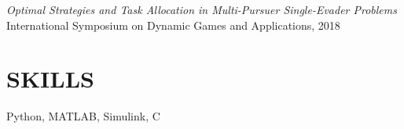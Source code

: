 \documentclass[margin, 10pt]{res} %
\newcommand{\ak}[1]{\textcolor{blue}{#1}}
\begin{document}
\begin{resume}
{\sl Optimal Strategies and Task Allocation in Multi-Pursuer Single-Evader Problems}\\
International Symposium on Dynamic Games and Applications, 2018


\section{SKILLS}
Python, MATLAB, Simulink, C




%


\end{resume}
\end{document}
